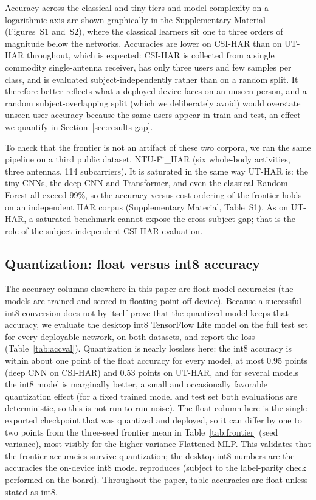 \documentclass{ieeeaccess}
\begin{document}
Accuracy across the classical and tiny tiers and model complexity on a logarithmic axis are shown graphically in the Supplementary Material (Figures~S1 and~S2), where the classical learners sit one to three orders of magnitude below the networks. Accuracies are lower on CSI-HAR than on UT-HAR throughout, which is expected: CSI-HAR is collected from a single commodity single-antenna receiver, has only three users and few samples per class, and is evaluated subject-independently rather than on a random split. It therefore better reflects what a deployed device faces on an unseen person, and a random subject-overlapping split (which we deliberately avoid) would overstate unseen-user accuracy because the same users appear in train and test, an effect we quantify in Section~\ref{sec:results-gap}.

To check that the frontier is not an artifact of these two corpora, we ran the same pipeline on a third public dataset, NTU-Fi\_HAR \cite{yang2023sensefi} (six whole-body activities, three antennas, 114 subcarriers). It is saturated in the same way UT-HAR is: the tiny CNNs, the deep CNN and Transformer, and even the classical Random Forest all exceed 99\%, so the accuracy-versus-cost ordering of the frontier holds on an independent HAR corpus (Supplementary Material, Table~S1). As on UT-HAR, a saturated benchmark cannot expose the cross-subject gap; that is the role of the subject-independent CSI-HAR evaluation.

\subsection{Quantization: float versus int8 accuracy}
\label{sec:results-quant}
The accuracy columns elsewhere in this paper are float-model accuracies (the models are trained and scored in floating point off-device). Because a successful int8 conversion does not by itself prove that the quantized model keeps that accuracy, we evaluate the desktop int8 TensorFlow Lite model on the full test set for every deployable network, on both datasets, and report the loss (Table~\ref{tab:accval}). Quantization is nearly lossless here: the int8 accuracy is within about one point of the float accuracy for every model, at most 0.95 points (deep CNN on CSI-HAR) and 0.53 points on UT-HAR, and for several models the int8 model is marginally better, a small and occasionally favorable quantization effect (for a fixed trained model and test set both evaluations are deterministic, so this is not run-to-run noise). The float column here is the single exported checkpoint that was quantized and deployed, so it can differ by one to two points from the three-seed frontier mean in Table~\ref{tab:frontier} (seed variance), most visibly for the higher-variance Flattened MLP. This validates that the frontier accuracies survive quantization; the desktop int8 numbers are the accuracies the on-device int8 model reproduces (subject to the label-parity check performed on the board). Throughout the paper, table accuracies are float unless stated as int8.
\end{document}
